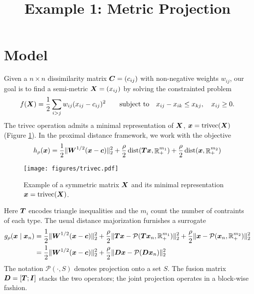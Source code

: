 \documentclass{article}
\title{Example 1: Metric Projection}
\author{}
\begin{document}
\maketitle

\section*{\center Model}

Given a \(n \times n\) dissimilarity matrix $\boldsymbol{C} = (c_{ij})$ with non-negative weights $w_{ij}$, our goal is to find a semi-metric \(\boldsymbol{X} = (x_{ij})\) by solving the constrainted problem
\begin{equation*}
    f(\boldsymbol{X})
    =
    \frac{1}{2} \sum_{i>j} w_{ij}(x_{ij} - c_{ij})^{2}
    \qquad
    \text{subject to}
    \quad
    x_{ij} - x_{ik} \le x_{kj},
    \quad
    x_{ij} \ge 0.
\end{equation*}
The $\mathrm{trivec}$ operation admits a minimal representation of \(\boldsymbol{X}\), \(\boldsymbol{x} = \mathrm{trivec}(\boldsymbol{X})\) (Figure \ref{fig:trivec-operation}).
In the proximal distance framework, we work with the objective
\begin{equation*}
  h_{\rho}(\boldsymbol{x})
  =
  \frac{1}{2} \|\boldsymbol{W}^{1/2}(\boldsymbol{x} - \boldsymbol{c})\|^{2}_{2}
  + \frac{\rho}{2} \mathop{\rm dist}\nolimits(\boldsymbol{T} \boldsymbol{x}, \mathop{\mathbb{R}}\nolimits_{+}^{m_{1}})
  + \frac{\rho}{2} \mathop{\rm dist}\nolimits(\boldsymbol{x}, \mathop{\mathbb{R}}\nolimits_{+}^{m_{2}})
\end{equation*}
\begin{figure}[!htbp]
    \centering
    \texttt{[image: figures/trivec.pdf]}
    \caption{
      Example of a symmetric matrix \(\boldsymbol{X}\) and its minimal representation \(\boldsymbol{x} = \mathrm{trivec}(\boldsymbol{X})\).
    }
    \label{fig:trivec-operation}
  \end{figure}
Here $\boldsymbol{T}$ encodes triangle inequalities and the $m_{i}$ count the number of contraints of each type.
The usual distance majorization furnishes a surrogate
\begin{align*}
    g_{\rho}(\boldsymbol{x} \mid \boldsymbol{x}_{n})
    &=
    \frac{1}{2} \|\boldsymbol{W}^{1/2} (\boldsymbol{x} - \boldsymbol{c})\|^{2}_{2}
    +
    \frac{\rho}{2} \|\boldsymbol{T} \boldsymbol{x} - \mathcal{P}(\boldsymbol{T} \boldsymbol{x}_{n}, \mathbb{R}_{+}^{m_{1}})\|^{2}_{2}
    +
    \frac{\rho}{2} \lVert{\boldsymbol{x}- \mathcal{P}(\boldsymbol{x}_{n}, \mathbb{R}_{+}^{m_{2}})}\rVert^{2}_{2} \\
    &=
    \frac{1}{2} \|\boldsymbol{W}^{1/2} (\boldsymbol{x} - \boldsymbol{c})\|^{2}_{2}
    +
    \frac{\rho}{2} \|\boldsymbol{D} \boldsymbol{x} - \mathcal{P}(\boldsymbol{D} \boldsymbol{x}_{n})\|_{2}^{2}
\end{align*}
The notation \(\mathcal{P}(\cdot, S)\) denotes projection onto a set \(S\).
The fusion matrix $\boldsymbol{D} = [\boldsymbol{T}; \boldsymbol{I}]$ stacks the two operators; the joint projection operates in a block-wise fashion.
\end{document}
